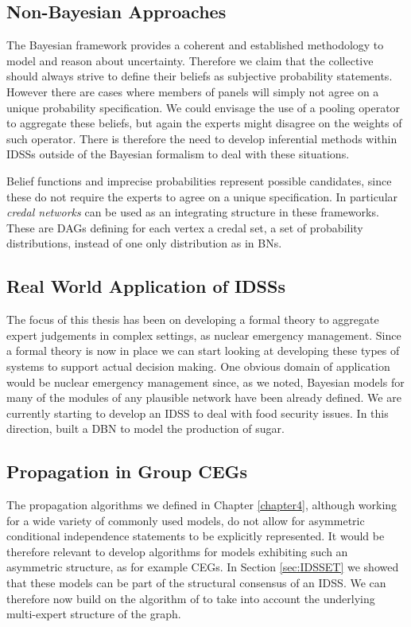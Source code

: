 \subsection*{Non-Bayesian Approaches}
The Bayesian framework provides a coherent and established methodology to model and reason about uncertainty. Therefore we claim that the collective should always strive to define their beliefs as subjective probability statements. However there are cases where members of panels will simply not agree on a unique probability specification. We could envisage the use of a pooling operator to aggregate these beliefs, but again the experts might disagree on the weights of such operator. There is therefore the need to develop inferential methods within IDSSs outside of the Bayesian formalism to deal with these situations. 

Belief functions \citep{Dempster1968,Shafer1976} and imprecise probabilities \citep{Walley1991} represent possible candidates, since these do not require the experts to agree on a unique specification. In particular \textit{credal networks} \citep{Cozman2000} can be used as an integrating structure in these frameworks. These are DAGs defining for each vertex a credal set, a set of probability distributions, instead of one only distribution as in BNs. 

\subsection*{Real World Application of IDSSs}
The focus of this thesis has been on developing a formal theory to aggregate expert judgements in complex settings, as nuclear emergency management.  Since a formal theory is now in place we can start looking at developing these types of systems to support actual decision making. One obvious domain of application would be nuclear emergency management since, as we noted, Bayesian models for many of the modules of any plausible network have been already defined. We are currently starting to develop an IDSS to deal with food security issues. In this direction, \citet{Barons2014} built a DBN to model the production of sugar.  

\subsection*{Propagation in Group CEGs}
The propagation algorithms we defined in Chapter \ref{chapter4}, although working for a wide variety of commonly used models, do not allow for asymmetric conditional independence statements to be explicitly represented. It would be therefore relevant to develop algorithms for models exhibiting such an asymmetric structure, as for example CEGs. In Section \ref{sec:IDSSET} we showed that these models can be part of the structural consensus of an IDSS. We can therefore now build on the algorithm of \citet{Thwaites2008} to take into account the underlying multi-expert structure of the graph. 

